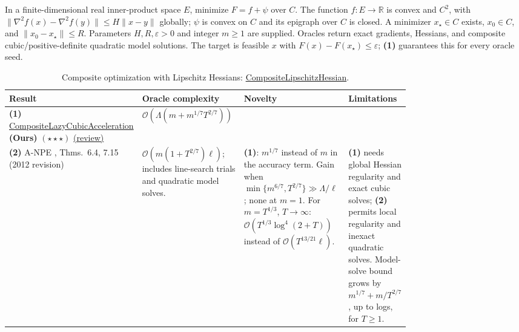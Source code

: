 \begin{table}[tp]
\centering
\caption{Composite optimization with Lipschitz Hessians: \href{https://github.com/k3nfalt/longtails/blob/main/LongTails/Setups/CompositeLipschitzHessian.lean}{CompositeLipschitzHessian}.}\label{tab:CompositeLipschitzHessian}
\parbox{\linewidth}{\footnotesize In a finite-dimensional real inner-product space $E$, minimize $F=f+\psi$ over $C$. The function $f:E\to\mathbb R$ is convex and $C^2$, with $\|\nabla^2 f(x)-\nabla^2 f(y)\|\le H\|x-y\|$ globally; $\psi$ is convex on $C$ and its epigraph over $C$ is closed. A minimizer $x_\star\in C$ exists, $x_0\in C$, and $\|x_0-x_\star\|\le R$. Parameters $H,R,\varepsilon>0$ and integer $m\ge1$ are supplied. Oracles return exact gradients, Hessians, and composite cubic/positive-definite quadratic model solutions. The target is feasible $x$ with $F(x)-F(x_\star)\le\varepsilon$; \textbf{(1)} guarantees this for every oracle seed.}\par\smallskip
\begin{threeparttable}
\footnotesize
\setlength{\tabcolsep}{4pt}\renewcommand{\arraystretch}{1.25}
\begin{tabularx}{\linewidth}{@{}>{\raggedright\arraybackslash}p{0.20\linewidth}>{\raggedright\arraybackslash}p{0.29\linewidth}>{\raggedright\arraybackslash}p{0.28\linewidth}>{\raggedright\arraybackslash}X@{}}
\toprule
\textbf{Result} & \textbf{Oracle complexity} & \textbf{Novelty} & \textbf{Limitations} \\
\midrule
\textbf{(1)} \href{https://github.com/k3nfalt/longtails/blob/main/LongTails/Theorems/CompositeLazyCubicAcceleration.lean}{Composite\allowbreak{}Lazy\allowbreak{}Cubic\allowbreak{}Acceleration} \textbf{(Ours)} $(\star\star\star)$ \href{https://github.com/k3nfalt/longtails/blob/main/scripts/reviews/CompositeLazyCubicAcceleration.md}{(review)}
& $\mathcal{O}\!\left(\Lambda(m+m^{1/7}T^{2/7})\right)$ & & \\
\midrule[1.2pt]
\textbf{(2)} A-NPE \citep{clhMonteiroSvaiter2013}, Thms.~6.4, 7.15 (2012 revision)
& $\mathcal{O}\!\left(m(1+T^{2/7})\ell\right)$; includes line-search trials and quadratic model solves.
& \textbf{(1)}: $m^{1/7}$ instead of $m$ in the accuracy term. Gain when $\min\{m^{6/7},T^{2/7}\}\gg\Lambda/\ell$; none at $m=1$. For $m=T^{1/3}$, $T\to\infty$: $\mathcal{O}(T^{1/3}\log^4(2+T))$ instead of $\mathcal{O}(T^{13/21}\ell)$.
& \textbf{(1)} needs global Hessian regularity and exact cubic solves; \textbf{(2)} permits local regularity and inexact quadratic solves. Model-solve bound grows by $m^{1/7}+m/T^{2/7}$, up to logs, for $T\ge1$. \\

\end{tabularx}
\end{threeparttable}
\end{table}
